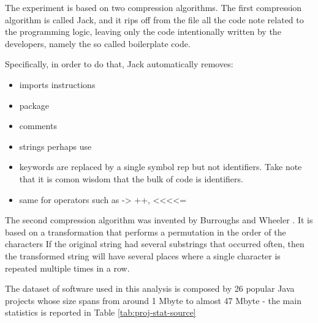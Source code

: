 
The experiment is based on two compression algorithms.
The first compression algorithm is called Jack, and it rips off from the file all the code note related to the programming logic, leaving
only the code intentionally written by the developers, namely the so called boilerplate code.

Specifically, in order to do that, Jack automatically removes:

\begin{itemize}
\item imports instructions
\item package
\item comments
\item strings perhaps use
\item keywords are replaced by a single symbol rep 
but not identifiers. Take note that it is comon wisdom that the bulk of code is identifiers.
\item same for operators such as -> ++, <<<<= 
\end{itemize}

The second compression algorithm was invented by Burroughs and Wheeler \cite{Burrows:Wheeler:1994}.
It is based on a transformation that performs a permutation in the order of the characters 
If the original string had several substrings that occurred often, then the transformed string will have several places where a single 
character is repeated multiple times in a row.

The dataset of software used in this analysis is composed by 26 popular Java projects whose size spans 
from around 1 Mbyte to almost 47 Mbyte - the main statistics is reported in Table \ref{tab:proj-stat-source}

\begin{table}
\centering
{}
\label{tab:proj-stat-source}
\caption{The results of the compression using the Burroughs-Wheeler algorithm}
\end{table}


